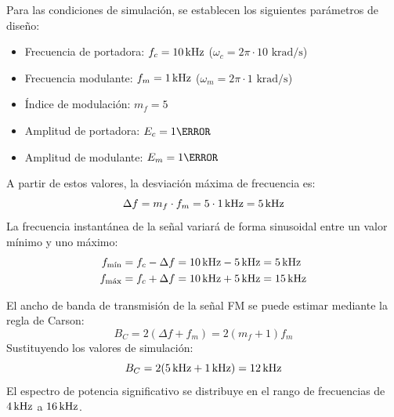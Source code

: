 Para las condiciones de simulación, se establecen los siguientes parámetros de diseño:
\begin{itemize}
    \item Frecuencia de portadora: $f_c = 10\,\mathrm{kHz}$ ($\omega_c = 2\pi \cdot 10\text{ krad/s}$)
    \item Frecuencia modulante: $f_m = 1\,\mathrm{kHz}$ ($\omega_m = 2\pi \cdot 1\text{ krad/s}$)
    \item Índice de modulación: $m_f = 5$
    \item Amplitud de portadora: $E_c = 1\V$
    \item Amplitud de modulante: $E_m = 1\V$
\end{itemize}

A partir de estos valores, la desviación máxima de frecuencia es:
\begin{equation*}
    \Delta f = m_f \cdot f_m = 5 \cdot 1\,\mathrm{kHz} = 5\,\mathrm{kHz}
\end{equation*}
La frecuencia instantánea de la señal variará de forma sinusoidal entre un valor mínimo y uno máximo:
\begin{align*}
    f_{\text{mín}} &= f_c - \Delta f = 10\,\mathrm{kHz} - 5\,\mathrm{kHz} = 5\,\mathrm{kHz} \\
    f_{\text{máx}} &= f_c + \Delta f = 10\,\mathrm{kHz} + 5\,\mathrm{kHz} = 15\,\mathrm{kHz}
\end{align*}

El ancho de banda de transmisión de la señal FM se puede estimar mediante la regla de Carson:
\begin{equation}
    B_C = 2(\Delta f + f_m) = 2(m_f + 1)f_m
    \label{eq.ej2:carson}
\end{equation}
Sustituyendo los valores de simulación:
\begin{equation*}
    B_C = 2(5\,\mathrm{kHz} + 1\,\mathrm{kHz}) = 12\,\mathrm{kHz}
\end{equation*}
El espectro de potencia significativo se distribuye en el rango de frecuencias de $4\,\mathrm{kHz}$ a $16\,\mathrm{kHz}$.

